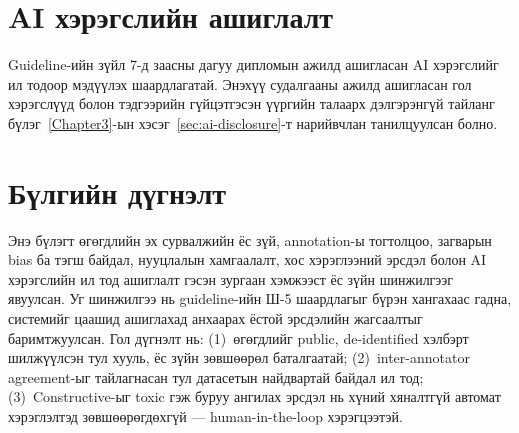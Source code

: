 \section{AI хэрэгслийн ашиглалт}
\label{sec:ai-disclosure-ref}

Guideline-ийн зүйл 7-д заасны дагуу дипломын ажилд ашигласан AI хэрэгслийг
ил тодоор мэдүүлэх шаардлагатай. Энэхүү судалгааны ажилд ашигласан гол
хэрэгслүүд болон тэдгээрийн гүйцэтгэсэн үүргийн талаарх дэлгэрэнгүй тайланг
бүлэг~\ref{Chapter3}-ын хэсэг~\ref{sec:ai-disclosure}-т нарийвчлан
танилцуулсан болно.

\section{Бүлгийн дүгнэлт}

Энэ бүлэгт өгөгдлийн эх сурвалжийн ёс зүй, annotation-ы тогтолцоо, загварын
bias ба тэгш байдал, нууцлалын хамгаалалт, хос хэрэглээний эрсдэл болон AI
хэрэгслийн ил тод ашиглалт гэсэн зургаан хэмжээст ёс зүйн шинжилгээг явуулсан.
Уг шинжилгээ нь guideline-ийн Ш-5 шаардлагыг бүрэн хангахаас гадна, системийг
цаашид ашиглахад анхаарах ёстой эрсдэлийн жагсаалтыг баримтжуулсан. Гол дүгнэлт
нь: (1)~өгөгдлийг public, de-identified хэлбэрт шилжүүлсэн тул хууль, ёс зүйн
зөвшөөрөл баталгаатай; (2)~inter-annotator agreement-ыг тайлагнасан тул
датасетын найдвартай байдал ил тод; (3)~Constructive-ыг toxic гэж буруу ангилах
эрсдэл нь хүний хяналтгүй автомат хэрэглэлтэд зөвшөөрөгдөхгүй --- human-in-the-loop
хэрэгцээтэй.
